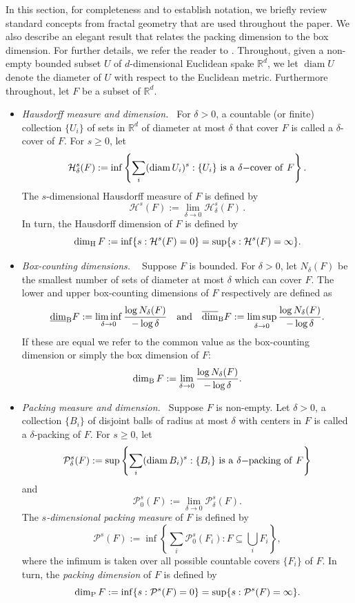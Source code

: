 \documentclass[12pt]{article}
\theoremstyle{definition}
\theoremstyle{remark}
\renewcommand{\emph}[1]{{\it#1}}
\DeclareMathOperator{\diam}{diam}
\begin{document}
In this section, for completeness and to establish notation, we briefly review standard concepts from fractal geometry that are used throughout the paper. We also describe an elegant result that relates the packing dimension to the box dimension. For further details, we refer the reader to \cite{F2003}. Throughout, given a non-empty bounded subset $U$ of $d$-dimensional Euclidean spake $\mathbb{R}^{d}$,  we let 
$\diam U$  denote the diameter of $U$ with respect to the Euclidean metric. Furthermore throughout, let $F$ be a subset of $\mathbb{R}^{d}$.


\begin{itemize}
    \item \emph{Hausdorff measure and dimension.\ }
For $\delta>0$, a countable (or finite) collection $\{U_{i}\}$ of sets in $\mathbb{R}^{d}$ of diameter at most $\delta$ that cover $F$ is called a $\delta$-cover of $F$. For  $s\geq0$, let
$$\mathcal{H}^{s}_{\delta}(F):=\inf\left\{\sum_{i}(\diam U_{i})^{s}:\{U_{i}\}\ {\rm is\ a}\  \delta {\rm -cover\ of}\ F\right\}.$$
The $s$-dimensional Hausdorff measure of $F$ is defined by 
\begin{equation*}
\mathcal{H}^{s}(F):=\lim_{\delta\to0}\mathcal{H}^{s}_{\delta}(F)  \, . 
\end{equation*}
In turn,  the  Hausdorff dimension of  $F$ is defined by 
\begin{equation*}
\dim_{\rm H}F:=\inf\{s:\mathcal{H}^{s}(F)=0\}=\sup\{s:\mathcal{H}^{s}(F)=\infty\}.
\end{equation*}
\item \emph{Box-counting dimensions. \ }   Suppose $F$ is bounded. 
For $\delta>0$, let $N_{\delta}(F)$ be the smallest number of sets of diameter at most $\delta$ which can cover $F$. The lower and upper box-counting dimensions of $F$ respectively are defined as
$$\underline{\dim}_{\rm B}F:=\liminf_{\delta\to0}\frac{\log N_{\delta}(F)}{-\log\delta}\quad {\rm and}\quad \overline{\dim}_{\rm B}F:=\limsup_{\delta\to0}\frac{\log N_{\delta}(F)}{-\log\delta}.$$
If these are equal we refer to the common value as the box-counting dimension or simply the  box dimension of $F$:
$$\dim_{\rm B}F:=\lim_{\delta\to0}\frac{\log N_{\delta}(F)}{-\log\delta}.$$

\item \emph{Packing measure and dimension.\ } 
Suppose $F$ is non-empty. Let $\delta>0$, a collection $\{B_{i}\}$ of disjoint balls of radius at most $\delta$ with centers in $F$ is called a $\delta$-packing of $F$. For $s\geq0$, let
$$\mathcal{P}_{\delta}^{s}(F):=\sup\left\{\sum_{i}(\diam B_{i})^{s}: \{B_{i}\}\ {\rm is\ a}\ \delta {\rm -packing}\  {\rm  of}\ F\right\}$$
and
$$\mathcal{P}_{0}^{s}(F):=\lim_{\delta\to0}\mathcal{P}_{\delta}^{s}(F).$$
The  \textit{$s$-dimensional packing measure} of $F$ is defined by 
$$\mathcal{P}^{s}(F):=\inf\left\{\sum_{i}\mathcal{P}_{0}^{s}(F_{i}):F\subseteq\bigcup_{i}F_{i}\right\},$$
where the infimum is taken over all possible countable covers $\{F_i\}$ of $F$. In turn,  the \textit{packing dimension} of $F$ is defined by
$$\dim_{\rm P}F:=\inf\{s:\mathcal{P}^{s}(F)=0\}=\sup\{s:\mathcal{P}^{s}(F)=\infty\}.$$
\end{itemize}
\end{document}
